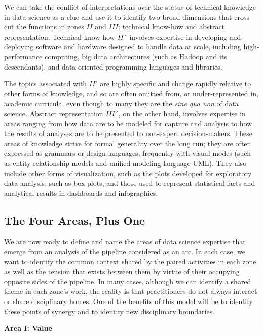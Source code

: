 \documentclass[
  letterpaper,
  DIV=11,
  numbers=noendperiod]{scrreprt}
\begin{document}
We can take the conflict of interpretations over the status of technical
knowledge in data science as a clue and use it to identify two broad
dimensions that cross-cut the functions in zones \(II\) and \(III\):
technical know-how and abstract representation. Technical know-how
\(II´\) involves expertise in developing and deploying software and
hardware designed to handle data at scale, including high-performance
computing, big data architectures (such as Hadoop and its descendants),
and data-oriented programming languages and libraries.

The topics associated with \(II'\) are highly specific and change
rapidly relative to other forms of knowledge, and so are often omitted
from, or under-represented in, academic curricula, even though to many
they are the \emph{sine qua non} of data science. Abstract
representation \(III´\), on the other hand, involves expertise in areas
ranging from how data are to be modeled for capture and analysis to how
the results of analyses are to be presented to non-expert
decision-makers. These areas of knowledge strive for formal generality
over the long run; they are often expressed as grammars or design
languages, frequently with visual modes (such as entity-relationship
models and unified modeling language UML). They also include other forms
of visualization, such as the plots developed for exploratory data
analysis, such as box plots, and those used to represent statistical
facts and analytical results in dashboards and infographics.

\hypertarget{the-four-areas-plus-one}{%
\subsection{The Four Areas, Plus One}\label{the-four-areas-plus-one}}

We are now ready to define and name the areas of data science expertise
that emerge from an analysis of the pipeline considered as an arc. In
each case, we want to identify the common context shared by the paired
activities in each zone as well as the tension that exists between them
by virtue of their occupying opposite sides of the pipeline. In many
cases, although we can identify a shared theme in each zone's work, the
reality is that practitioners do not always interact or share
disciplinary homes. One of the benefits of this model will be to
identify these points of synergy and to identify new disciplinary
boundaries.

\textbf{Area I: Value}
\end{document}
